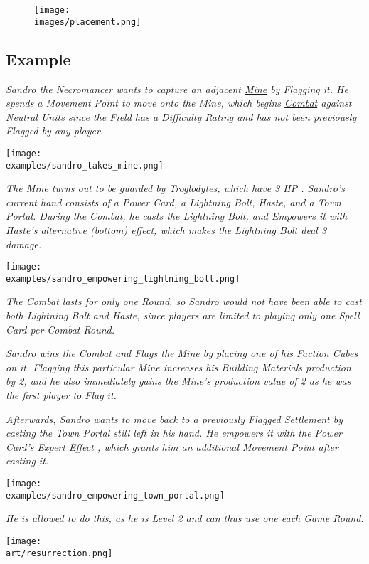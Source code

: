 \begin{figure*}[!hb]
  \centering
  \texttt{[image: \\images/placement.png]}
\end{figure*}

\clearpage

\subsection*{Example}

\begin{multicols*}{2}

\textit{Sandro the Necromancer wants to capture an adjacent \hyperlink{Mines}{Mine} by Flagging it.
He spends a Movement Point to move onto the Mine, which begins \hyperlink{Combat}{Combat} against Neutral Units since the Field has a \hyperlink{Difficulty}{Difficulty Rating} and has not been previously Flagged by any player.}\par

\texttt{[image: \\examples/sandro\_takes\_mine.png]}

\textit{The Mine turns out to be guarded by Troglodytes, which have 3 HP .
Sandro's current hand consists of a Power Card, a Lightning Bolt, Haste, and a Town Portal.
During the Combat, he casts the Lightning Bolt, and Empowers  it with Haste's alternative (bottom) effect, which makes the Lightning Bolt deal 3 damage.}

\texttt{[image: \\examples/sandro\_empowering\_lightning\_bolt.png]}

\textit{
The Combat lasts for only one Round, so Sandro would not have been able to cast both Lightning Bolt and Haste, since players are limited to playing only one Spell Card per Combat Round.}\par


\textit{Sandro wins the Combat and Flags the Mine by placing one of his Faction Cubes on it.
Flagging this particular Mine increases his Building Materials  production by 2, and he also immediately gains the Mine's production value of 2  as he was the first player to Flag it.}\par
\textit{Afterwards, Sandro wants to move back to a previously Flagged Settlement by casting the Town Portal still left in his hand.
He empowers it with the Power Card's Expert Effect , which grants him an additional Movement Point after casting it.
}

\texttt{[image: \\examples/sandro\_empowering\_town\_portal.png]}

\textit{He is allowed to do this, as he is Level 2 and can thus use one  each Game Round.}

\vfill
\hspace{2em}
\texttt{[image: \\art/resurrection.png]}
\end{multicols*}

